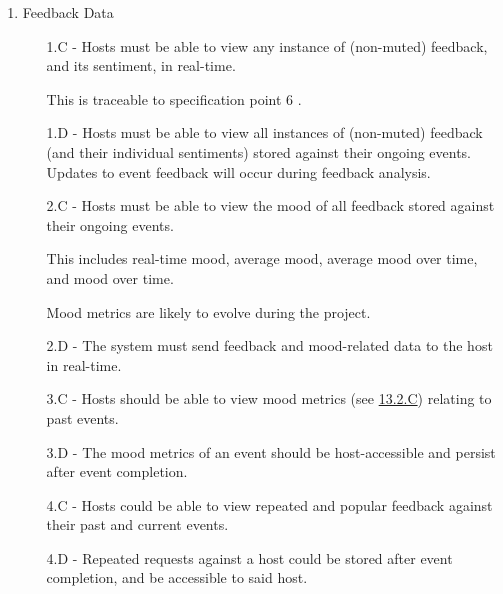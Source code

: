 \documentclass[9pt, titlepage]{extarticle}
\begin{document}
\begin{enumerate}[leftmargin=*]
\item Feedback Data 
\begin{enumerate}[noitemsep, topsep=0pt, leftmargin=9mm]
\item[1.C -] Hosts must be able to view any instance of (non-muted) feedback, and its sentiment, in real-time. 
\item[] This is traceable to specification point 6 \autocite{web:spec}.
\item[1.D -] Hosts must be able to view all instances of (non-muted) feedback (and their individual sentiments) stored against their ongoing events.
Updates to event feedback will occur during feedback analysis.
\vspace*{1mm}
\item[2.C -] Hosts must be able to view the mood of all feedback stored against their ongoing events. 
\item[] This includes real-time mood, average mood, average mood over time, and mood over time. 
\item[] Mood metrics are likely to evolve during the project.
\item[2.D -] The system must send feedback and mood-related data to the host in real-time.
\vspace*{1mm}
\item[3.C -] Hosts should be able to view mood metrics (see \hyperref[req:f]{13.2.C}) relating to past events.
\item[3.D -] The mood metrics of an event should be host-accessible and persist after event completion.
\vspace*{1mm}
\item[4.C -] Hosts could be able to view repeated and popular feedback against their past and current events.
\item[4.D -] Repeated requests against a host could be stored after event completion, and be accessible to said host.
\end{enumerate}


\end{enumerate}
\end{document}
